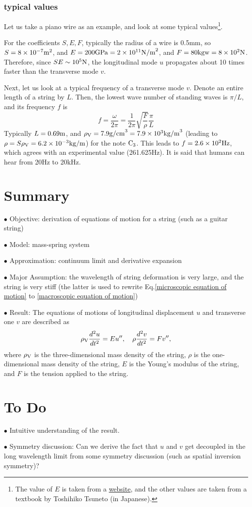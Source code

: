 \documentclass{article}
\begin{document}
\subsubsection{typical values}
Let us take a piano wire as an example, and look at some typical values\footnote{
The value of $E$ is taken from a \href{https://www.kagaspring.com/keyword/item_806.html}{website}, and the other values are taken from a textbook by Toshihiko Tsuneto (in Japanese).
}.

For the coefficients $S, E, F$, typically the radius of a wire is 0.5mm, so $S=8\times 10^{-7}{\rm m}^2$, and  
$E=200{\rm GPa}=2\times 10^{11}{\rm N/m}^2$, and $F=80{\rm kgw}=8\times 10^2{\rm N}$.  Therefore, since $SE\sim 10^5{\rm N}$, the longitudinal mode $u$ propagates about 10 times faster than the transverse mode $v$.  

Next, let us look at a typical frequency of a transverse mode $v$.  Denote an entire length of a string by $L$.  Then, the lowest wave number of standing waves is $\pi/L$, and its frequency $f$ is 
$$
f = \frac{\omega}{2\pi} = \frac{1}{2\pi}\sqrt{\frac{F}{\rho}}\frac{\pi}{L}
$$
Typically $L=0.69{\rm m}$, and $\rho_{\rm V}=7.9{\rm g/cm}^3=7.9\times 10^3{\rm kg/m}^3$ (leading to $\rho=S\rho_{\rm V}=6.2\times 10^{-3}{\rm kg/m}$) for the note ${\rm C}_3$.   This leads to $f=2.6\times 10^2{\rm Hz}$, which agrees with an experimental value (261.625Hz). It is said that humans can hear from 20Hz to 20kHz.  

\section{Summary}
$\bullet$ Objective: derivation of equations of motion for a string (such as a guitar string)

\noindent$\bullet$ Model: mass-spring system

\noindent $\bullet$ Approximation: continuum limit and derivative expansion

\noindent $\bullet$ Major Assumption: the wavelength of string deformation is very large, and the string is very stiff (the latter is used to rewrite Eq.\eqref{microscopic equation of motion} to \eqref{macroscopic equation of motion})

\noindent $\bullet$ Result: The equations of motions of longitudinal displacement $u$ and transverse one $v$ are described as 
\begin{align}
    \rho_{\rm V}\frac{d^2u}{dt^2} = E u'', \quad \rho\frac{d^2v}{dt^2} = F v'',
\end{align}
where $\rho_{\rm V}$ is the three-dimensional mass density of the string, $\rho$ is the one-dimensional mass density of the string,  $E$ is the Young's modulus of the string, and $F$ is the tension applied to the string. 


\section{To Do}
 $\bullet$ Intuitive understanding of the result. 

\noindent $\bullet$ Symmetry discussion: Can we derive the fact that $u$ and $v$ get decoupled in the long wavelength limit from some symmetry discussion (such as spatial inversion symmetry)?
\end{document}
